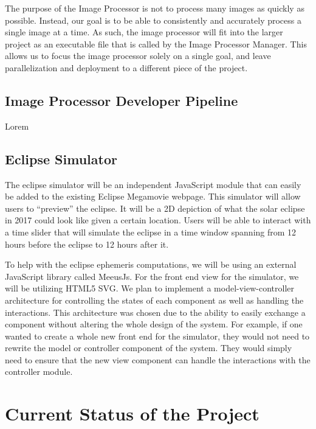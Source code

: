 \documentclass[10pt, onecolumn, draftclsnofoot, letterpaper, compsoc]{IEEEtran}
\begin{document}
The purpose of the Image Processor is not to process many images as quickly as
possible. Instead, our goal is to be able to consistently and accurately process
a single image at a time. As such, the image processor will fit into the larger
project as an executable file that is called by the Image Processor Manager.
This allows us to focus the image processor solely on a single goal, and leave
parallelization and deployment to a different piece of the project. \\

\subsection{Image Processor Developer Pipeline}

Lorem \\

\subsection{Eclipse Simulator}

The eclipse simulator will be an independent JavaScript module that can easily
be added to the existing Eclipse Megamovie webpage. This simulator will allow
users to “preview” the eclipse. It will be a 2D depiction of what the solar
eclipse in 2017 could look like given a certain location. Users will be able
to interact with a time slider that will simulate the eclipse in a time
window spanning from 12 hours before the eclipse to 12 hours after it.

To help with the eclipse ephemeris computations, we will be using an external
JavaScript library called MeeusJs. For the front end view for the simulator,
we will be utilizing HTML5 SVG. We plan to implement a model-view-controller
architecture for controlling the states of each component as well as handling
the interactions. This architecture was chosen due to the ability to easily
exchange a component without altering the whole design of the system. For
example, if one wanted to create a whole new front end for the simulator,
they would not need to rewrite the model or controller component of the system.
They would simply need to ensure that the new view component can handle the
interactions with the controller module. \\


\section{Current Status of the Project}
\end{document}
